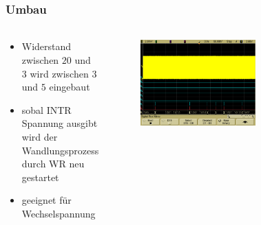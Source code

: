 \begin{frame}
    \frametitle{Umbau}
    \framesubtitle{}
    \begin{columns}[c]
            \begin{block}{}
                \begin{itemize}
                    \item Widerstand zwischen $20$ und $3$ wird zwischen $3$ und $5$
                    eingebaut
                    \item sobal INTR Spannung ausgibt wird der Wandlungsprozess
                    durch WR neu gestartet
                    \item geeignet für Wechselspannung
                \end{itemize}
            \end{block}
            \begin{figure}[H]
            \begin{center}
                    \includegraphics[scale=0.12]{./img/oszi/scope_12.png}
            \end{center}
            \end{figure}
            \begin{figure}[H]
            \begin{center}
            \end{center}
            \end{figure}
    \end{columns}
\end{frame}
